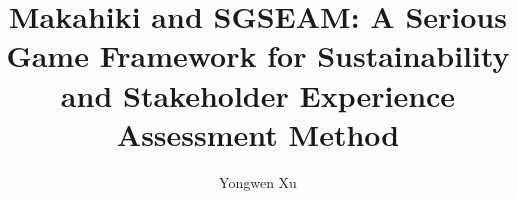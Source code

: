 \documentclass[11pt,final,dissertation,actual,subfigure]{uhthesis}
\begin{document}
\title{Makahiki and SGSEAM: A Serious Game Framework for Sustainability and Stakeholder Experience Assessment Method}
\author{Yongwen Xu}



\maketitle


\begin{frontmatter}







\tableofcontents




\end{frontmatter}
\end{document}
